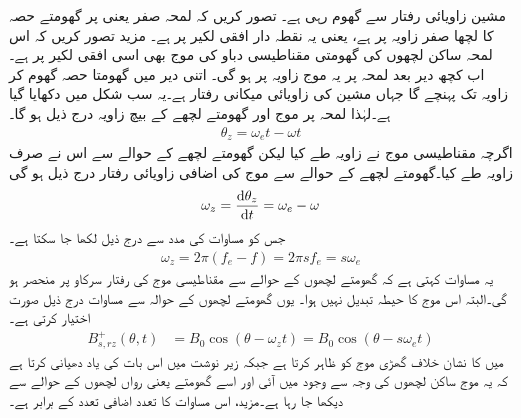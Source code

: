 مشین  زاویائی رفتار سے گھوم رہی ہے۔ تصور کریں کہ لمحہ صفر یعنی  پر گھومتے حصہ کا   لچھا صفر زاویہ پر ہے، یعنی یہ نقطہ دار افقی لکیر پر ہے۔ مزید تصور کریں کہ اس لمحہ ساکن لچھوں کی گھومتی مقناطیسی دباو کی موج بھی اسی افقی لکیر پر ہے۔ اب کچھ دیر بعد لمحہ  پر یہ موج زاویہ   پر ہو گی۔ اتنی دیر میں گھومتا حصہ گھوم کر زاویہ   تک پہنچے گا جہاں   مشین کی زاویائی میکانی رفتار ہے۔یہ سب شکل  میں دکھایا گیا ہے۔لہٰذا لمحہ  پر موج اور گھومتے لچھے کے بیچ زاویہ  درج ذیل ہو گا۔
\begin{align}
\theta_z=\omega_e t -\omega t
\end{align}
اگرچہ مقناطیسی موج نے  زاویہ طے کیا لیکن گھومتے لچھے کے حوالے سے اس نے صرف  زاویہ  طے کیا۔گھومتے لچھے کے حوالے سے  موج کی  اضافی زاویائی رفتار  درج ذیل ہو گی
\begin{align}
\omega_z=\frac{\dif \theta_z}{\dif t}=\omega_e -\omega
\end{align}
جس کو مساوات  کی مدد سے درج ذیل لکھا جا سکتا ہے۔
\begin{align}
\omega_z=2 \pi (f_e-f)=2 \pi s f_e = s \omega_e
\end{align}
یہ مساوات کہتی ہے کہ گھومتے لچھوں کے حوالے سے مقناطیسی موج کی رفتار سرکاو  پر منحصر ہو گی۔البتہ اس موج کا حیطہ  تبدیل نہیں ہوا۔ یوں گھومتے لچھوں کے حوالہ سے مساوات  درج ذیل صورت اختیار کرتی ہے۔
\begin{align}
B_{s,rz}^+(\theta,t)&=B_0 \cos (\theta-\omega_z t)=B_0 \cos (\theta -s \omega_e t)
\end{align}
 میں  کا نشان  خلاف گھڑی موج کو ظاہر کرتا ہے جبکہ  زیر نوشت میں    اس بات کی یاد دھیانی کرتا ہے کہ یہ موج ساکن لچھوں کی وجہ سے وجود میں آئی  اور اسے گھومتے یعنی رواں لچھوں کے حوالے سے دیکھا جا رہا ہے۔مزید، اس مساوات کا تعدد اضافی تعدد  کے برابر ہے۔

